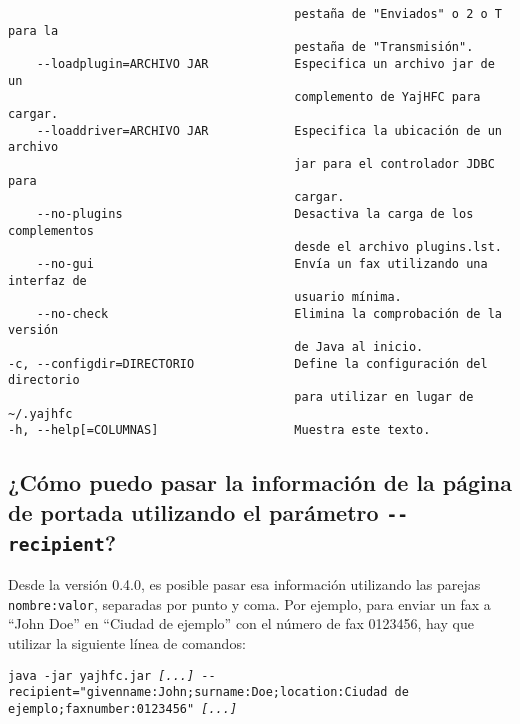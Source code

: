 \documentclass[a4paper,10pt]{scrartcl}
\begin{document}
\begin{verbatim}
                                        pestaña de "Enviados" o 2 o T para la
                                        pestaña de "Transmisión".
    --loadplugin=ARCHIVO JAR            Especifica un archivo jar de un
                                        complemento de YajHFC para cargar.
    --loaddriver=ARCHIVO JAR            Especifica la ubicación de un archivo
                                        jar para el controlador JDBC para
                                        cargar.
    --no-plugins                        Desactiva la carga de los complementos
                                        desde el archivo plugins.lst.
    --no-gui                            Envía un fax utilizando una interfaz de
                                        usuario mínima.
    --no-check                          Elimina la comprobación de la versión
                                        de Java al inicio.
-c, --configdir=DIRECTORIO              Define la configuración del directorio
                                        para utilizar en lugar de ~/.yajhfc
-h, --help[=COLUMNAS]                   Muestra este texto.
\end{verbatim}

\subsection{¿Cómo puedo pasar la información de la página de portada utilizando el parámetro \texttt{-{-}recipient}?}

Desde la versión 0.4.0, es posible pasar esa información utilizando las parejas \texttt{nombre:valor}, separadas por punto y coma. Por ejemplo, para enviar un fax a ``John Doe'' en ``Ciudad de ejemplo'' con el número de fax 0123456, hay que utilizar la siguiente línea de comandos:

\texttt{java -jar yajhfc.jar \textit{[...]} -{-}recipient="givenname:John;surname:Doe;location:Ciudad de ejemplo;faxnumber:0123456" \textit{[...]}}
\end{document}

